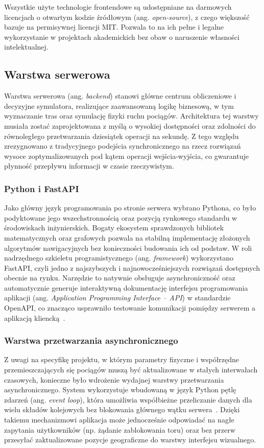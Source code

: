 \documentclass[twoside]{projektInzynierskiMS1z}
\begin{document}
Wszystkie użyte technologie frontendowe są udostępniane na darmowych licencjach
o otwartym kodzie źródłowym (ang. \emph{open-source}), z czego większość bazuje na
permisywnej licencji MIT. Pozwala to na ich pełne i legalne wykorzystanie w projektach
akademickich bez obaw o naruszenie własności intelektualnej.

\subsection{Warstwa serwerowa}

Warstwa serwerowa (ang. \emph{backend}) stanowi główne centrum obliczeniowe i decyzyjne
symulatora, realizujące zaawansowaną logikę biznesową, w tym wyznaczanie tras oraz
symulację fizyki ruchu pociągów. Architektura tej warstwy musiała zostać zaprojektowana
z myślą o wysokiej dostępności oraz zdolności do równoległego przetwarzania dziesiątek
operacji na sekundę. Z tego względu zrezygnowano z tradycyjnego podejścia
synchronicznego na rzecz rozwiązań wysoce zoptymalizowanych pod kątem operacji
wejścia-wyjścia, co gwarantuje płynność przepływu informacji w czasie rzeczywistym.

\subsubsection{Python i FastAPI}

Jako główny język programowania po stronie serwera wybrano Pythona, co było podyktowane
jego wszechstronnością oraz pozycją rynkowego standardu w środowiskach inżynierskich.
Bogaty ekosystem sprawdzonych bibliotek matematycznych oraz grafowych pozwala na
stabilną implementację złożonych algorytmów nawigacyjnych bez konieczności budowania
ich od podstaw. W roli nadrzędnego szkieletu programistycznego (ang. \emph{framework})
wykorzystano FastAPI, czyli jedno z najszybszych i najnowocześniejszych rozwiązań
dostępnych obecnie na rynku. Narzędzie to natywnie obsługuje asynchroniczność oraz
automatycznie generuje interaktywną dokumentację interfejsu programowania aplikacji
(ang. \emph{Application Programming Interface -- API}) w standardzie OpenAPI, co znacząco
usprawniło testowanie komunikacji pomiędzy serwerem a aplikacją kliencką~\cite{fastapi}.

\subsubsection{Warstwa przetwarzania asynchronicznego}

Z uwagi na specyfikę projektu, w którym parametry fizyczne i współrzędne
przemieszczających się pociągów muszą być aktualizowane w stałych interwałach
czasowych, konieczne było wdrożenie wydajnej warstwy przetwarzania asynchronicznego.
System wykorzystuje wbudowaną w język Python pętlę zdarzeń (ang. \emph{event loop}),
która umożliwia współbieżne przeliczanie danych dla wielu składów kolejowych bez
blokowania głównego wątku serwera~\cite{pythonasyncio}. Dzięki takiemu mechanizmowi
aplikacja może jednocześnie odpowiadać na nagłe zapytania użytkowników (np. żądanie
zablokowania toru) oraz bez przerw przesyłać zaktualizowane pozycje geograficzne do
warstwy interfejsu wizualnego.
\end{document}

